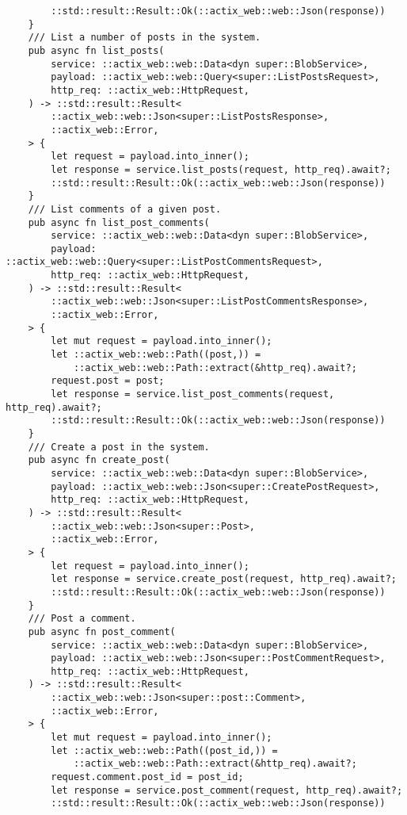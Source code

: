 \begin{verbatim}
        ::std::result::Result::Ok(::actix_web::web::Json(response))
    }
    /// List a number of posts in the system.
    pub async fn list_posts(
        service: ::actix_web::web::Data<dyn super::BlobService>,
        payload: ::actix_web::web::Query<super::ListPostsRequest>,
        http_req: ::actix_web::HttpRequest,
    ) -> ::std::result::Result<
        ::actix_web::web::Json<super::ListPostsResponse>,
        ::actix_web::Error,
    > {
        let request = payload.into_inner();
        let response = service.list_posts(request, http_req).await?;
        ::std::result::Result::Ok(::actix_web::web::Json(response))
    }
    /// List comments of a given post.
    pub async fn list_post_comments(
        service: ::actix_web::web::Data<dyn super::BlobService>,
        payload: ::actix_web::web::Query<super::ListPostCommentsRequest>,
        http_req: ::actix_web::HttpRequest,
    ) -> ::std::result::Result<
        ::actix_web::web::Json<super::ListPostCommentsResponse>,
        ::actix_web::Error,
    > {
        let mut request = payload.into_inner();
        let ::actix_web::web::Path((post,)) =
            ::actix_web::web::Path::extract(&http_req).await?;
        request.post = post;
        let response = service.list_post_comments(request, http_req).await?;
        ::std::result::Result::Ok(::actix_web::web::Json(response))
    }
    /// Create a post in the system.
    pub async fn create_post(
        service: ::actix_web::web::Data<dyn super::BlobService>,
        payload: ::actix_web::web::Json<super::CreatePostRequest>,
        http_req: ::actix_web::HttpRequest,
    ) -> ::std::result::Result<
        ::actix_web::web::Json<super::Post>,
        ::actix_web::Error,
    > {
        let request = payload.into_inner();
        let response = service.create_post(request, http_req).await?;
        ::std::result::Result::Ok(::actix_web::web::Json(response))
    }
    /// Post a comment.
    pub async fn post_comment(
        service: ::actix_web::web::Data<dyn super::BlobService>,
        payload: ::actix_web::web::Json<super::PostCommentRequest>,
        http_req: ::actix_web::HttpRequest,
    ) -> ::std::result::Result<
        ::actix_web::web::Json<super::post::Comment>,
        ::actix_web::Error,
    > {
        let mut request = payload.into_inner();
        let ::actix_web::web::Path((post_id,)) =
            ::actix_web::web::Path::extract(&http_req).await?;
        request.comment.post_id = post_id;
        let response = service.post_comment(request, http_req).await?;
        ::std::result::Result::Ok(::actix_web::web::Json(response))

\end{verbatim}
